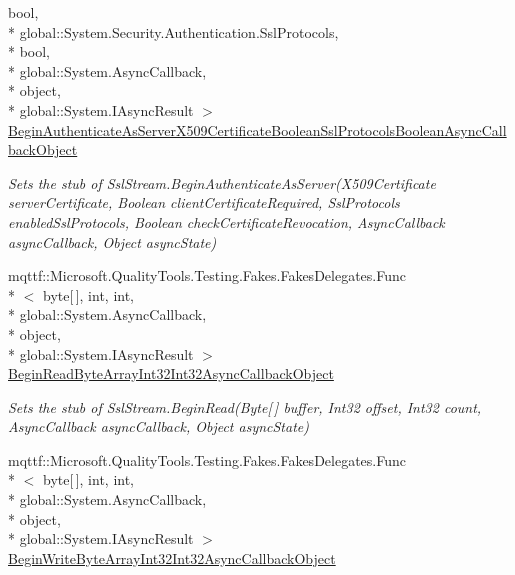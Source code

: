 \begin{DoxyCompactItemize}
bool, \\*
global\-::\-System.\-Security.\-Authentication.\-Ssl\-Protocols, \\*
bool, \\*
global\-::\-System.\-Async\-Callback, \\*
object, \\*
global\-::\-System.\-I\-Async\-Result $>$ \hyperlink{class_system_1_1_net_1_1_security_1_1_fakes_1_1_stub_ssl_stream_ac0bc7afedba15db800d9ba107280a9c9}{Begin\-Authenticate\-As\-Server\-X509\-Certificate\-Boolean\-Ssl\-Protocols\-Boolean\-Async\-Callback\-Object}
\begin{DoxyCompactList}\small\item\em Sets the stub of Ssl\-Stream.\-Begin\-Authenticate\-As\-Server(\-X509\-Certificate server\-Certificate, Boolean client\-Certificate\-Required, Ssl\-Protocols enabled\-Ssl\-Protocols, Boolean check\-Certificate\-Revocation, Async\-Callback async\-Callback, Object async\-State)\end{DoxyCompactList}\item 
mqttf\-::\-Microsoft.\-Quality\-Tools.\-Testing.\-Fakes.\-Fakes\-Delegates.\-Func\\*
$<$ byte\mbox{[}$\,$\mbox{]}, int, int, \\*
global\-::\-System.\-Async\-Callback, \\*
object, \\*
global\-::\-System.\-I\-Async\-Result $>$ \hyperlink{class_system_1_1_net_1_1_security_1_1_fakes_1_1_stub_ssl_stream_ac2bea323961ae49eec1d1694fb07f8ea}{Begin\-Read\-Byte\-Array\-Int32\-Int32\-Async\-Callback\-Object}
\begin{DoxyCompactList}\small\item\em Sets the stub of Ssl\-Stream.\-Begin\-Read(\-Byte\mbox{[}$\,$\mbox{]} buffer, Int32 offset, Int32 count, Async\-Callback async\-Callback, Object async\-State)\end{DoxyCompactList}\item 
mqttf\-::\-Microsoft.\-Quality\-Tools.\-Testing.\-Fakes.\-Fakes\-Delegates.\-Func\\*
$<$ byte\mbox{[}$\,$\mbox{]}, int, int, \\*
global\-::\-System.\-Async\-Callback, \\*
object, \\*
global\-::\-System.\-I\-Async\-Result $>$ \hyperlink{class_system_1_1_net_1_1_security_1_1_fakes_1_1_stub_ssl_stream_ad98f51f4f54114d8526f7d687dac0658}{Begin\-Write\-Byte\-Array\-Int32\-Int32\-Async\-Callback\-Object}

\end{DoxyCompactItemize}
